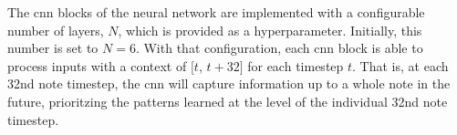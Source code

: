 
The \gls{cnn} blocks of the neural network are implemented
with a configurable number of layers, $N$, which is provided
as a hyperparameter. Initially, this number is set to $N=6$.
With that configuration, each \gls{cnn} block is able to
process inputs with a context of $[t$, $t + 32]$ for each
timestep $t$. That is, at each \gls{32nd} note timestep, the
\gls{cnn} will capture information up to a \gls{whole} note
in the future, prioritzing the patterns learned at the level
of the individual \gls{32nd} note timestep.
